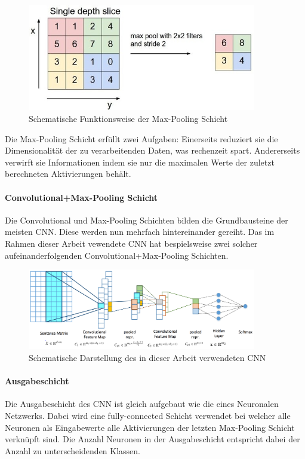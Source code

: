 \begin{figure}[H]
	\centering
	\includegraphics[width=10cm]{img/max_pooling}
	\caption{Schematische Funktionsweise der Max-Pooling Schicht}
\end{figure}

Die Max-Pooling Schicht erfüllt zwei Aufgaben: Einerseits reduziert sie die Dimensionalität der zu verarbeitenden Daten, was rechenzeit spart. Andererseits verwirft sie  Informationen indem sie nur die maximalen Werte der zuletzt berechneten Aktivierungen behält.

\paragraph{Convolutional+Max-Pooling Schicht} Die Convolutional und Max-Pooling Schichten bilden die Grundbausteine der meisten CNN. Diese werden nun mehrfach hintereinander gereiht. Das im Rahmen dieser Arbeit vewendete CNN hat bespielsweise zwei solcher aufeinanderfolgenden Convolutional+Max-Pooling Schichten.

\begin{figure}[h]
	\centering
	\includegraphics[width=10cm]{img/semeval_cnn_structure}
	\caption{Schematische Darstellung des in dieser Arbeit verwendeten CNN \protect\cite{Deriu:2016}}
\end{figure}

\paragraph{Ausgabeschicht}\label{basic:cnn:output_layer} Die Ausgabeschicht des CNN ist gleich aufgebaut wie die eines  Neuronalen Netzwerks. Dabei wird eine fully-connected Schicht verwendet bei welcher alle Neuronen als Eingabewerte alle Aktivierungen der letzten Max-Pooling Schicht verknüpft sind. Die Anzahl Neuronen in der Ausgabeschicht entspricht dabei der Anzahl zu unterscheidenden Klassen.

